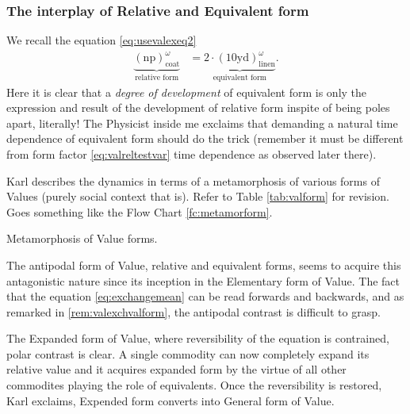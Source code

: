 \documentclass[12pt]{extarticle}
\theoremstyle{definition}
\begin{document}
 \subsubsection{The interplay of Relative and Equivalent form}
  We recall the equation \ref{eq:usevalexeq2}
  \begin{align}
  \underbrace{(\text{np})_{\text{coat}}^{\omega}}_{\text{relative form}} &= \underbrace{2\cdot (10\text{yd})_{\text{linen}}^{\omega}}_{\text{equivalent form}}.
  \end{align}
  Here it is clear that a \emph{degree of development} of equivalent form is only the expression and result of the development of relative form inspite of being poles apart, literally!  The Physicist inside me exclaims that demanding a natural time dependence of equivalent form should do the trick (remember it must be different from form factor \ref{eq:valreltestvar} time dependence as observed later there).

  Karl describes the dynamics in terms of a metamorphosis of various forms of Values (purely social context that is).  Refer to Table \ref{tab:valform} for revision.  Goes something like the Flow Chart \ref{fc:metamorform}.
  
\begin{fccontainer}
\caption{Metamorphosis of Value forms.}
\label{fc:metamorform}
\end{fccontainer}

The antipodal form of Value, relative and equivalent forms, seems to acquire this antagonistic nature since its inception in the Elementary form of Value.  The fact that the equation \ref{eq:exchangemean} can be read forwards and backwards, and as remarked in \ref{rem:valexchvalform}, the antipodal contrast is difficult to grasp.

The Expanded form of Value, where reversibility of the equation is contrained, polar contrast is clear.  A single commodity can now completely expand its relative value and it acquires expanded form by the virtue of all other commodites playing the role of equivalents.  Once the reversibility is restored, Karl exclaims, Expended form converts into General form of Value.
\end{document}
